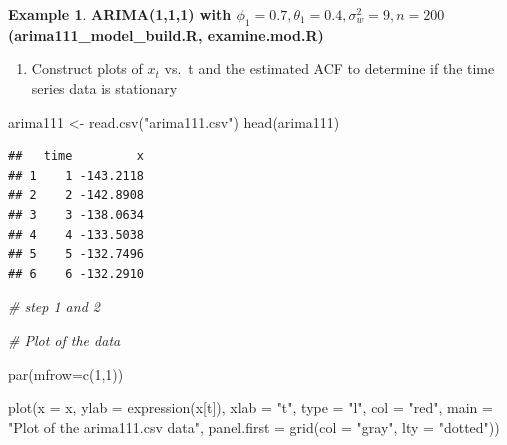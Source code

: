 \documentclass[
]{book}
\newenvironment{Shaded}{\begin{snugshade}}{\end{snugshade}}
\newcommand{\AttributeTok}[1]{\textcolor[rgb]{0.77,0.63,0.00}{#1}}
\newcommand{\CommentTok}[1]{\textcolor[rgb]{0.56,0.35,0.01}{\textit{#1}}}
\newcommand{\DecValTok}[1]{\textcolor[rgb]{0.00,0.00,0.81}{#1}}
\newcommand{\FunctionTok}[1]{\textcolor[rgb]{0.00,0.00,0.00}{#1}}
\newcommand{\NormalTok}[1]{#1}
\newcommand{\OtherTok}[1]{\textcolor[rgb]{0.56,0.35,0.01}{#1}}
\newcommand{\SpecialCharTok}[1]{\textcolor[rgb]{0.00,0.00,0.00}{#1}}
\newcommand{\StringTok}[1]{\textcolor[rgb]{0.31,0.60,0.02}{#1}}
\providecommand{\tightlist}{%
  \setlength{\itemsep}{0pt}\setlength{\parskip}{0pt}}
\theoremstyle{definition}
\theoremstyle{definition}
\newtheorem{example}{Example}[chapter]
\theoremstyle{definition}
\theoremstyle{definition}
\theoremstyle{remark}
\begin{document}
\begin{example}

\textbf{ARIMA(1,1,1) with \(\phi_1=0.7, \theta_1=0.4, \sigma_w^2=9, n=200\) (arima111\_model\_build.R, examine.mod.R)}

\begin{enumerate}
\def\labelenumi{\arabic{enumi}.}
\tightlist
\item
  Construct plots of \(x_t\) vs.~t and the estimated ACF to determine if the time series data is stationary
\end{enumerate}

\begin{Shaded}
\begin{Highlighting}[]
\NormalTok{arima111 }\OtherTok{\textless{}{-}} \FunctionTok{read.csv}\NormalTok{(}\StringTok{"arima111.csv"}\NormalTok{)}
\FunctionTok{head}\NormalTok{(arima111)}
\end{Highlighting}
\end{Shaded}

\begin{verbatim}
##   time         x
## 1    1 -143.2118
## 2    2 -142.8908
## 3    3 -138.0634
## 4    4 -133.5038
## 5    5 -132.7496
## 6    6 -132.2910
\end{verbatim}

\begin{Shaded}
\end{Shaded}

\begin{Shaded}
\begin{Highlighting}[]
\CommentTok{\# step 1 and 2}

\CommentTok{\# Plot of the data}

\FunctionTok{par}\NormalTok{(}\AttributeTok{mfrow=}\FunctionTok{c}\NormalTok{(}\DecValTok{1}\NormalTok{,}\DecValTok{1}\NormalTok{))}

\FunctionTok{plot}\NormalTok{(}\AttributeTok{x =}\NormalTok{ x, }\AttributeTok{ylab =} \FunctionTok{expression}\NormalTok{(x[t]), }\AttributeTok{xlab =} \StringTok{"t"}\NormalTok{, }\AttributeTok{type =} 
    \StringTok{"l"}\NormalTok{, }\AttributeTok{col =} \StringTok{"red"}\NormalTok{,  }\AttributeTok{main =} \StringTok{"Plot of the }
\StringTok{    arima111.csv data"}\NormalTok{, }\AttributeTok{panel.first =} \FunctionTok{grid}\NormalTok{(}\AttributeTok{col =} \StringTok{"gray"}\NormalTok{, }
    \AttributeTok{lty =} \StringTok{"dotted"}\NormalTok{))}


\end{Highlighting}
\end{Shaded}
\end{example}
\end{document}
